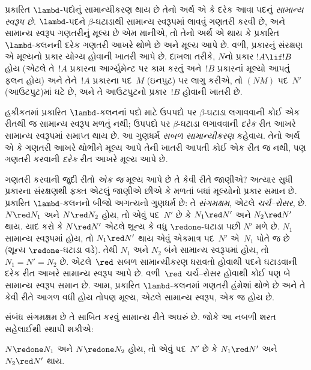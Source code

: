 \documentclass[../../../include/open-logic-section]{subfiles}
\begin{document}
પ્રકારિત $\lambd$-પદોનું સામાન્યીકરણ થાય છે તેનો
અર્થ એ કે દરેક આવા પદનું \emph{સામાન્ય સ્વરૂપ છે}.
$\lambd$-પદને $\beta$-ઘટાડાથી સામાન્ય સ્વરૂપમાં
લાવવું ગણતરી કરવી છે, અને સામાન્ય સ્વરૂપ
ગણતરીનું મૂલ્ય છે એમ માનીએ, તો તેનો અર્થ
એ થાય કે પ્રકારિત $\lambd$-કલનની દરેક ગણતરી
આખરે થોભે છે અને મૂલ્ય આપે છે. વળી,
પ્રકારનું સંરક્ષણ એ મૂલ્યનો પ્રકાર યોગ્ય
હોવાની ખાતરી આપે છે. દાખલા તરીકે, $N$નો
પ્રકાર $!A \lif !B$ હોય (એટલે તે~$!A$
પ્રકારના આર્ગ્યુમેન્ટ પર કામ કરતું અને~$!B$
પ્રકારનાં મૂલ્યો આપતું ફલન હોય) અને તેને~$!A$
પ્રકારના પદ~$M$ (ઇનપુટ) પર લાગુ કરીએ,
તો $(NM)$ પદ~$N'$ (આઉટપુટ)માં ઘટે છે,
અને તે આઉટપુટનો પ્રકાર~$!B$ હોવાની ખાતરી છે.


હકીકતમાં પ્રકારિત $\lambd$-કલનનાં પદો માટે
ઉપપદો પર $\beta$-ઘટાડા લગાવવાની કોઈ એક
રીતથી જ સામાન્ય સ્વરૂપ મળતું નથી; ઉપપદો
પર $\beta$-ઘટાડા લગાવવાની \emph{દરેક}
રીત આખરે સામાન્ય સ્વરૂપમાં સમાપ્ત થાય છે.
આ ગુણધર્મ \emph{સબળ સામાન્યીકરણ} કહેવાય.
તેનો અર્થ એ કે ગણતરી આખરે થોભીને મૂલ્ય
આપે તેની ખાતરી આપતી કોઈ એક રીત જ નથી,
પણ ગણતરી કરવાની \emph{દરેક} રીત
આખરે મૂલ્ય આપે છે.

ગણતરી કરવાની જુદી રીતો \emph{એક જ} મૂલ્ય
આપે છે તે કેવી રીતે જાણીએ? અત્યાર સુધી
પ્રકારના સંરક્ષણથી ફક્ત એટલું જાણીએ છીએ
કે મળતાં બધાં મૂલ્યોનો પ્રકાર સમાન છે.
પ્રકારિત $\lambd$-કલનનો બીજો અગત્યનો
ગુણધર્મ છે: તે \emph{સંગમક્ષમ}, એટલે
\emph{ચર્ચ--રોસર}, છે.
$N \red N_1$ અને $N \red N_2$ હોય,
તો એવું પદ~$N'$ છે કે $N_1 \red N'$
અને $N_2 \red N'$ થાય. યાદ કરો કે
$N \red N'$ એટલે શૂન્ય કે વધુ
$\redone$-ઘટાડા પછી $N'$ મળે છે.
$N_1$ સામાન્ય સ્વરૂપમાં હોય, તો
$N_1 \red N'$ થાય એવું એકમાત્ર પદ~$N'$
એ~$N_1$ પોતે જ છે (શૂન્ય
$\redone$-ઘટાડા વડે). તેથી $N_1$ અને
$N_2$ બંને સામાન્ય સ્વરૂપમાં હોય, તો
$N_1 = N' = N_2$ છે. એટલે~$\red$
સબળ સામાન્યીકરણ ધરાવતો હોવાથી પદને
ઘટાડવાની દરેક રીત આખરે સામાન્ય સ્વરૂપ આપે છે.
વળી~$\red$ ચર્ચ--રોસર હોવાથી કોઈ પણ
બે સામાન્ય સ્વરૂપ સમાન છે. આમ, પ્રકારિત
$\lambd$-કલનમાં ગણતરી હંમેશાં થોભે છે
અને તે કેવી રીતે આગળ વધી હોય તોપણ
મૂલ્ય, એટલે સામાન્ય સ્વરૂપ, એક જ હોય છે.

સંબંધ સંગમક્ષમ છે તે સાબિત કરવું સામાન્ય રીતે
અઘરું છે. જોકે આ નબળી શરત સહેલાઈથી
સ્થાપી શકીએ:

\begin{prop}
$N \redone N_1$ અને $N \redone N_2$ હોય,
તો એવું પદ~$N'$ છે કે $N_1 \red N'$
અને $N_2 \red N'$ થાય.
\end{prop}
\end{document}
